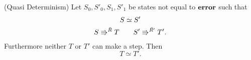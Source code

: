 \begin{theorem}{(Quasi Determinism)} \label{thm:qd}
  Let $S_0, S'_0, S_1, S'_1$ be states not equal to $\mbox{{\bf error}}$ such that
  \begin{equation*}
    \begin{gathered}
      S \simeq S' \\
      S \Rrightarrow^{\bar{R}} T \quad\quad S' \Rrightarrow^{\bar{R'}} T'.
    \end{gathered}
  \end{equation*}
  Furthermore neither $T$ or $T'$ can make a step.
  Then
  \begin{equation*}
    T \simeq T'.
  \end{equation*}
\end{theorem}

